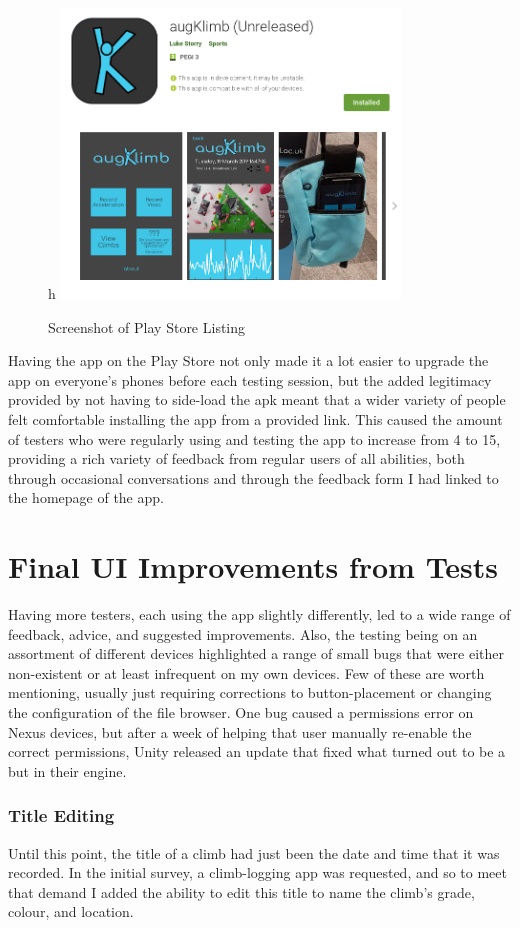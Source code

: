 \begin{figure}{h}
\centering
\includegraphics[width=9cm]{imgs/playstorescreenshot}
\caption{Screenshot of Play Store Listing}
\label{fig:playstore}
\end{figure}

Having the app on the Play Store not only made it a lot easier to upgrade the app on everyone's phones before each testing session, but the added legitimacy provided by not having to side-load the apk meant that a wider variety of people felt comfortable installing the app from a provided link.
This caused the amount of testers who were regularly using and testing the app to increase from 4 to 15, providing a rich variety of feedback from regular users of all abilities, both through occasional conversations and through the feedback form I had linked to the homepage of the app.




\section{Final UI Improvements from Tests}
Having more testers, each using the app slightly differently, led to a wide range of feedback, advice, and suggested improvements.
Also, the testing being on an assortment of different devices highlighted a range of small bugs that were either non-existent or at least infrequent on my own devices.
Few of these are worth mentioning, usually just requiring corrections to button-placement or changing the configuration of the file browser.
One bug caused a permissions error on Nexus devices, but after a week of helping that user manually re-enable the correct permissions, Unity released an update that fixed what turned out to be a but in their engine.

\subsubsection{Title Editing}
Until this point, the title of a climb had just been the date and time that it was recorded.
In the initial survey, a climb-logging app was requested, and so to meet that demand I added the ability to edit this title to name the climb's grade, colour, and location.


